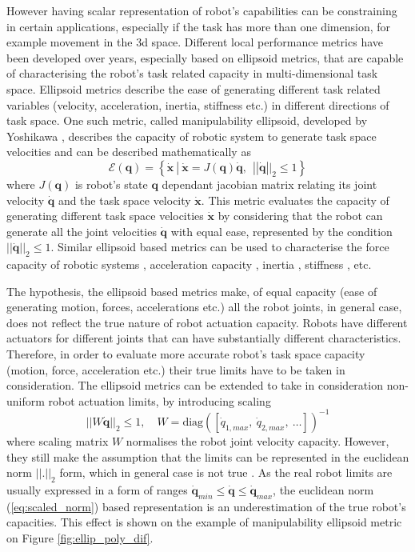 However having scalar representation of robot's capabilities can be constraining in certain applications, especially if the task has more than one dimension, for example movement in the 3d space. Different local performance metrics have been developed over years, especially based on ellipsoid metrics, that are capable of characterising the robot's task related capacity in multi-dimensional task space. Ellipsoid metrics describe the ease of generating different task related variables (velocity, acceleration, inertia, stiffness etc.) in different directions of task space. One such metric, called manipulability ellipsoid, developed by Yoshikawa \cite{yoshikawa_manipulability_1985}, describes the capacity of robotic system to generate task space velocities and can be described mathematically as
\begin{equation}
    \mathcal{E}(\bm{q}) = \left\{ \dot{\bm{x}} ~|~ \dot{\bm{x}} = J(\bm{q})\dot{\bm{q}},~~ ||\dot{\bm{q}}||_2 \leq 1 \right\}
\end{equation}
where $J(\bm{q})$ is robot's state $\bm{q}$ dependant jacobian matrix relating its joint velocity $\dot{\bm{q}}$ and the task space velocity $\dot{\bm{x}}$. This metric evaluates the capacity of generating different task space velocities $\dot{\bm{x}}$ by considering that the robot can generate all the joint velocities $\dot{\bm{q}}$ with equal ease, represented by the condition $||\dot{\bm{q}}||_2 \leq 1$. Similar ellipsoid based metrics can be used to characterise the force capacity of robotic systems \cite{chiacchio_global_1991}, acceleration capacity \cite{yoshikawa1985dynamic}, inertia \cite{Asada1984}, stiffness \cite{ajoudani2015role}, etc. 

The hypothesis, the ellipsoid based metrics make, of equal capacity (ease of generating motion, forces, accelerations etc.) all the robot joints, in general case, does not reflect the true nature of robot actuation capacity. Robots have different actuators for different joints that can have substantially different characteristics. Therefore, in order to evaluate more accurate robot's task space capacity (motion, force, acceleration etc.) their true limits have to be taken in consideration. The ellipsoid metrics can be extended to take in consideration non-uniform robot actuation limits, by introducing scaling
\begin{equation}
    ||W\dot{\bm{q}}||_2 \leq 1, \quad W=\text{diag}\left(\left[\dot{q}_{1,max} ,~\dot{q}_{2,max} , ~\ldots\right]\right)^{-1}
    \label{eq:scaled_norm}
\end{equation}    
where scaling matrix $W$ normalises the robot joint velocity capacity. However, they still make the assumption that the limits can be represented in the euclidean norm  $||.||_2$ form, which in general case is not true \cite{Lee1997manip}. As the real robot limits are usually expressed in a form of ranges $ \dot{\bm{q}}_{min} \leq \dot{\bm{q}} \leq \dot{\bm{q}}_{max}$, the euclidean norm (\ref{eq:scaled_norm}) based representation is an underestimation of the true robot's capacities. This effect is shown on the example of manipulability ellipsoid metric on Figure \ref{fig:ellip_poly_dif}. 

